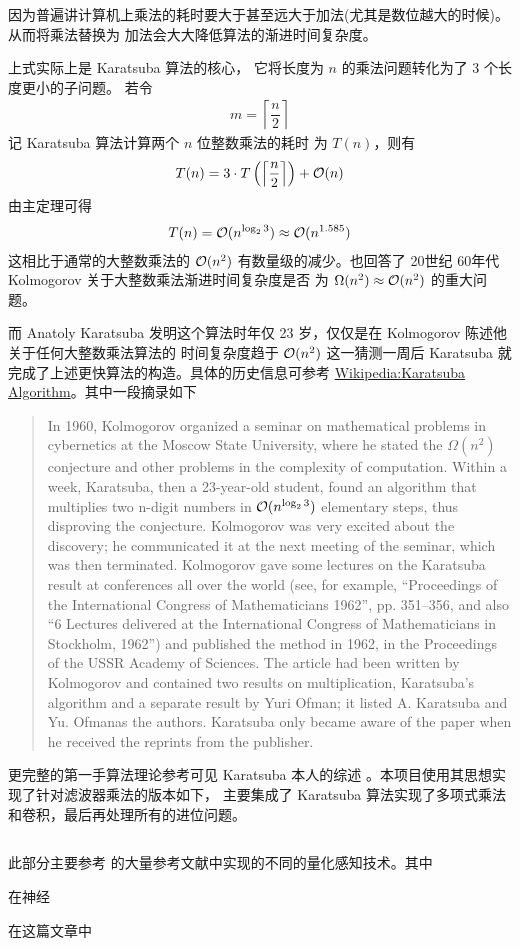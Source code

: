 因为普遍讲计算机上乘法的耗时要大于甚至远大于加法(尤其是数位越大的时候)。从而将乘法替换为
加法会大大降低算法的渐进时间复杂度。

上式实际上是 Karatsuba 算法的核心，
它将长度为 $n$ 
的乘法问题转化为了 3 个长度更小的子问题。
若令 
\begin{eqnarray*}
    m = \left\lceil \dfrac n 2 \right\rceil
\end{eqnarray*} 
记 Karatsuba 算法计算两个 $n$ 位整数乘法的耗时
为 $T(n)$，则有 
\begin{eqnarray*}
    T(n) = 3 \cdot T \left(\left\lceil \dfrac n 2 \right\rceil\right) + \mathcal{O}(n)
\end{eqnarray*}
由主定理可得 
\begin{eqnarray*}
    T(n) = \mathcal{O} (n^{\log_2 3}) \approx \mathcal{O} (n^{1.585})
\end{eqnarray*}
这相比于通常的大整数乘法的 $\mathcal{O} (n^2)$ 有数量级的减少。也回答了 20世纪 60年代 Kolmogorov 关于大整数乘法渐进时间复杂度是否
为 $\Omega(n^2) \approx \mathcal{O} (n^2)$ 的重大问题。

而 Anatoly Karatsuba 发明这个算法时年仅 23 岁，仅仅是在 Kolmogorov 陈述他关于任何大整数乘法算法的
时间复杂度趋于 $\mathcal{O}(n^2)$ 这一猜测一周后 Karatsuba 就完成了上述更快算法的构造。具体的历史信息可参考 
\href{https://en.wikipedia.org/wiki/Karatsuba_algorithm}{Wikipedia:Karatsuba Algorithm}。其中一段摘录如下

\begin{quote}
    In 1960, 
    Kolmogorov organized a seminar on mathematical problems in cybernetics 
    at the Moscow State University, where he stated the $\Omega (n^2)$ conjecture and other problems 
    in the complexity of computation. Within a week, Karatsuba, then a 23-year-old student, found an
     algorithm that multiplies two n-digit numbers in $\mathcal{O} (n^{\log_2 3})$ elementary steps, thus 
    disproving the conjecture. Kolmogorov was very excited about the discovery; 
    he communicated it at the next meeting of the seminar, which was then terminated. 
    Kolmogorov gave some lectures on the Karatsuba result at conferences all over the world 
    (see, for example, ``Proceedings of the International Congress of Mathematicians 1962'', 
    pp. 351–356, and also ``6 Lectures delivered at the International Congress of Mathematicians 
    in Stockholm, 1962'') and published the method in 1962, in the Proceedings of the USSR Academy 
    of Sciences. The article had been written by Kolmogorov and contained two results on 
    multiplication, Karatsuba's algorithm and a separate result by Yuri Ofman; it listed 
    \textquotedbl A. Karatsuba and Yu. Ofman\textquotedbl as the authors. Karatsuba only became aware of the paper 
    when he received the reprints from the publisher.
\end{quote}

更完整的第一手算法理论参考可见 Karatsuba 本人的综述 \cite{Karatsuba1995}。本项目使用其思想实现了针对滤波器乘法的版本如下，
主要集成了 Karatsuba 算法实现了多项式乘法和卷积，最后再处理所有的进位问题。

\subsection{}

此部分主要参考  的大量参考文献中实现的不同的量化感知技术。其中

在神经

在这篇文章中
